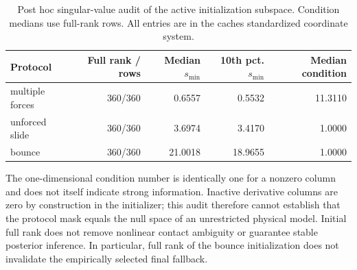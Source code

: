 \par\begin{table}[htbp]\centering\small
\caption{Post hoc singular-value audit of the active initialization subspace. Condition medians use full-rank rows. All entries are in the cache\textquotesingle s standardized coordinate system.}
\label{tab:support_jacobian}
\begin{tabular}{lrrrr}\toprule Protocol & Full rank / rows & Median $s_{\min}$ & 10th pct. $s_{\min}$ & Median condition\\\midrule
multiple forces & 360/360 & 0.6557 & 0.5532 & 11.3110 \\
unforced slide & 360/360 & 3.6974 & 3.4170 & 1.0000 \\
bounce & 360/360 & 21.0018 & 18.9655 & 1.0000 \\
\bottomrule\end{tabular}\end{table}\par

The one-dimensional condition number is identically one for a nonzero column and does not itself indicate strong information. Inactive derivative columns are zero by construction in the initializer; this audit therefore cannot establish that the protocol mask equals the null space of an unrestricted physical model. Initial full rank does not remove nonlinear contact ambiguity or guarantee stable posterior inference. In particular, full rank of the bounce initialization does not invalidate the empirically selected final fallback.
